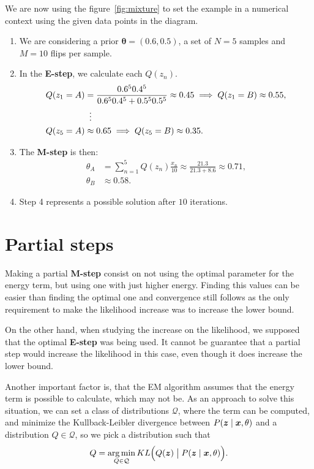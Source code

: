 We are now using the figure~\ref{fig:mixture} to set the example in a numerical context using the given data points in the diagram.
\begin{enumerate}
  \item We are considering a prior \(\bm{\theta} = (0.6, 0.5)\), a set of \(N = 5\) samples and \(M = 10\) flips per sample.
  \item In the \textbf{E-step}, we calculate each \(Q(z_{n})\).
    \[
    \begin{aligned}
      Q(z_{1} = A) &= \frac{0.6^{5} 0.4^{5}}{0.6^{5}0.4^{5} + 0.5^{5}0.5^{5}} \approx 0.45 \implies Q(z_{1} = B) \approx 0.55,\\
      &\mathrel{\makebox[\widthof{=}]{\vdots}} \\
      Q(z_{5} = A) &\approx 0.65 \implies Q(z_{5}=B) \approx 0.35.
    \end{aligned}
    \]
  \item The \textbf{M-step} is then:
    \[
    \begin{aligned}
      \theta_{A} &= \sum_{n=1}^{5}Q(z_{n})\frac{x_{n}}{10} \approx \frac{21.3}{21.3 + 8.6} \approx 0.71,\\
      \theta_{B} &\approx 0.58.
    \end{aligned}
    \]
  \item Step 4 represents a possible solution after \(10\) iterations.
\end{enumerate}


\section{Partial steps}

Making a partial \textbf{M-step} consist on not using the optimal parameter for the energy term, but using one with just higher energy. Finding this values can be easier than finding the optimal one and convergence still follows as the only requirement to make the likelihood increase was to increase the lower bound.

On the other hand, when studying the increase on the likelihood, we supposed that the optimal \textbf{E-step} was being used. It cannot be guarantee that a partial step would increase the likelihood in this case, even though it does increase the lower bound.

Another important factor is, that the EM algorithm assumes that the energy term is possible to calculate, which may not be. As an approach to solve this situation, we can set a class of distributions \(\mathcal{Q}\), where the term can be computed, and minimize the Kullback-Leibler divergence between \(P(\bm{z} \mid \bm{x}, \theta)\) and a distribution \(Q \in \mathcal{Q}\), so we pick a distribution such that
\[
  Q = \operatorname*{arg\,min}_{Q \in \mathcal{Q}} KL\Big(Q(\bm{z}) \bigm| P(\bm{z}\mid \bm{x}, \theta)\Big).
\]

